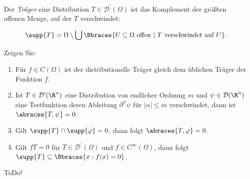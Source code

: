 
\begin{exercise}

Der \textit{Träger} eine Distribution $T \in \mathcal{D}^\prime(\Omega)$ ist das Komplement der größten offenen Menge, auf der $T$ verschwindet:

\begin{align*}
    \supp{T}
    =
    \Omega
    \setminus
    \bigcup
    \Bbraces
    {
        U \subseteq \Omega ~\text{offen}~ |~
        T ~\text{verschwindet auf}~ U
    }.
\end{align*}

Zeigen Sie:

\begin{enumerate}[label = (\roman*)]
    \item Für $f \in C(\Omega)$ ist der distributionelle Träger gleich dem üblichen Träger der Funktion $f$.
    \item Ist $T \in \mathcal{D}^\prime(\R^n)$ eine Distribution von endlicher Ordnung $m$ und $\psi \in \mathcal{D}(\R^n)$ eine Testfunktion deren Ableitung $\partial^\alpha \psi$ für $|\alpha| \leq m$ verschwindet, dann ist $\abraces{T, \psi} = 0$.
    \item Gilt $\supp{T} \cap \supp{\varphi} = 0$, dann folgt $\abraces{T, \varphi} = 0$.
    \item Gilt $fT = 0$ für $T \in \mathcal{D}^\prime(\Omega)$ und $f \in C^\infty(\Omega)$, dann folgt $\supp{T} \subseteq \Bbraces{x: f(x) = 0}$.
\end{enumerate}

\end{exercise}


\begin{solution}

ToDo!

\end{solution}

